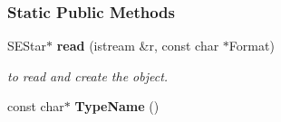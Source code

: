 \subsubsection*{Static Public Methods}
\begin{CompactItemize}
\item 
{}
SEStar$\ast$ {\bf read} (istream \&r, const char $\ast$Format)\label{class_sestar_d0}

\begin{CompactList}\small\item\em to read and create the object.\item\end{CompactList}\item 
{}
const char$\ast$ {\bf Type\-Name} ()\label{class_sestar_d1}

\end{CompactItemize}
